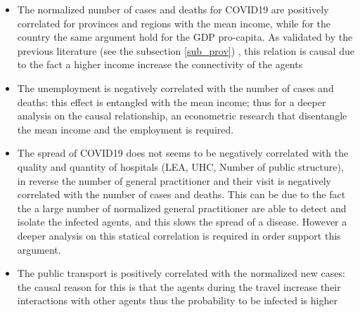 \documentclass[
12pt, %
a4paper, %
oneside, %
headinclude,footinclude, %
BCOR5mm, %
]{scrartcl}
\begin{document}
\begin{itemize}
\item The normalized number of cases and deaths for COVID19 are positively correlated for provinces and regions with the mean income, while for the country the same argument hold for the GDP pro-capita. As validated by the previous literature (see the subsection \ref{sub_prov}) , this relation is causal due to the fact a higher income increase the connectivity of the agents
\item The unemployment is negatively correlated with the number of cases and deaths: this effect is entangled with the mean income; thus for a deeper analysis on the causal relationship, an econometric research that disentangle the mean income and the employment is required. 
\item The spread of COVID19 does not seems to be negatively correlated with the quality and quantity of hospitals (LEA, UHC, Number of public structure), in reverse the number of general practitioner and their visit is negatively correlated with the number of cases and deaths. This can be due to the fact the a large number of normalized general practitioner are able to detect and isolate the infected agents, and this slows the spread of a disease. However a deeper analysis on this statical correlation is required in order support this argument. 
\item The public transport is positively correlated with the normalized new cases: the causal reason for this is that the agents during the travel increase their interactions with other agents thus the probability to be infected is higher
\end{itemize}
\end{document}
